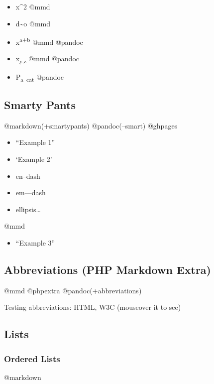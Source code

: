 \documentclass[]{article}
\providecommand{\tightlist}{%
  \setlength{\itemsep}{0pt}\setlength{\parskip}{0pt}}
\begin{document}
\begin{itemize}
\tightlist
\item
  x\^{}2 @mmd
\item
  d\textasciitilde{}o @mmd
\item
  x\textsuperscript{a+b} @mmd @pandoc
\item
  x\textsubscript{y,z} @mmd @pandoc
\item
  P\textsubscript{a~cat} @pandoc
\end{itemize}

\subsection{Smarty Pants}\label{smarty-pants}

@markdown(+smartypants) @pandoc(--smart) @ghpages

\begin{itemize}
\tightlist
\item
  ``Example 1''
\item
  `Example 2'
\item
  en--dash
\item
  em---dash
\item
  ellipsis\ldots{}
\end{itemize}

@mmd

\begin{itemize}
\tightlist
\item
  ``Example 3''
\end{itemize}

\subsection{Abbreviations (PHP Markdown
Extra)}\label{abbreviations-php-markdown-extra}

@mmd @phpextra @pandoc(+abbreviations)

Testing abbreviations: HTML, W3C (mouseover it to see)

\subsection{Lists}\label{lists}

\subsubsection{Ordered Lists}\label{ordered-lists}

@markdown
\end{document}
